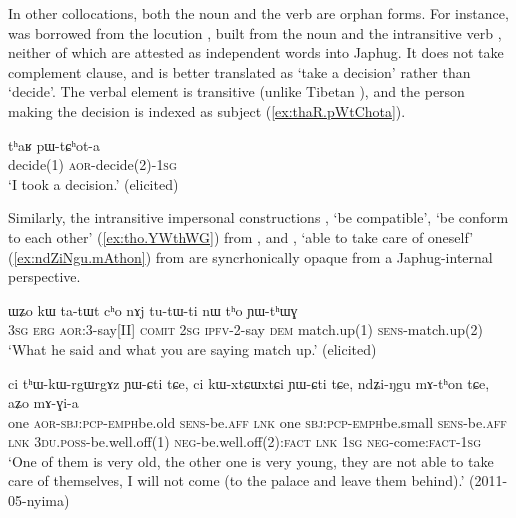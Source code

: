 In other collocations, both the noun and the verb are orphan forms. For instance,  was borrowed from the locution , built from the noun  and the intransitive verb , neither of which are attested as independent words into Japhug.   It does not take complement clause, and is better translated as `take a decision' rather than `decide'. The verbal element  is transitive (unlike Tibetan ), and the person making the decision is indexed as subject (\ref{ex:thaR.pWtChota}).
 
\begin{exe}
\ex \label{ex:thaR.pWtChota}
\gll tʰaʁ pɯ-tɕʰot-a \\
decide(1) \textsc{aor}-decide(2)-\textsc{1sg} \\
\glt `I took a decision.' (elicited)
  \end{exe}  

Similarly, the intransitive impersonal constructions  , `be compatible', `be conform to each other' (\ref{ex:tho.YWthWG}) from , and  , `able to take care of oneself' (\ref{ex:ndZiNgu.mAthon}) from  are syncrhonically opaque from a Japhug-internal perspective.
 
 
\begin{exe}
\ex \label{ex:tho.YWthWG}
\gll ɯʑo kɯ ta-tɯt cʰo nɤj tu-tɯ-ti nɯ tʰo ɲɯ-tʰɯɣ \\
\textsc{3sg} \textsc{erg} \textsc{aor}:3\flobv{}-say[II] \textsc{comit} \textsc{2sg} \textsc{ipfv}-2-say \textsc{dem} match.up(1) \textsc{sens}-match.up(2) \\
\glt `What he said and what you are saying match up.' (elicited)
\end{exe}  
 

\begin{exe}
\ex \label{ex:ndZiNgu.mAthon}
\gll   ci tʰɯ-kɯ-rgɯ\redp{}rgɤz ɲɯ-ɕti tɕe, ci kɯ-xtɕɯ\redp{}xtɕi ɲɯ-ɕti tɕe, ndʑi-ŋgu mɤ-tʰon tɕe, aʑo mɤ-ɣi-a \\
one \textsc{aor}-\textsc{sbj}:\textsc{pcp}-\textsc{emph}\redp{}be.old \textsc{sens}-be.\textsc{aff} \textsc{lnk} one \textsc{sbj}:\textsc{pcp}-\textsc{emph}\redp{}be.small \textsc{sens}-be.\textsc{aff} \textsc{lnk} \textsc{3du}.\textsc{poss}-be.well.off(1) \textsc{neg}-be.well.off(2):\textsc{fact} \textsc{lnk} \textsc{1sg} \textsc{neg}-come:\textsc{fact}-\textsc{1sg} \\
\glt `One of them is very old, the other one is very young, they are not able to take care of themselves, I will not come (to the palace and leave them behind).' (2011-05-nyima)
\end{exe}  
  
